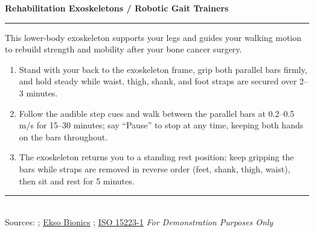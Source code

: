 \documentclass[11pt,a4paper]{article}
\begin{document}
\vspace{-0.3em}
\noindent\dashrule{\textwidth}
\begin{center}
{\large\bfseries Rehabilitation Exoskeletons / Robotic Gait Trainers}
\end{center}
\noindent\rule{\textwidth}{0.4pt}

\vspace{0.3em}
This lower-body exoskeleton supports your legs and guides your walking motion to rebuild strength and mobility after your bone cancer surgery.

\begin{enumerate}[leftmargin=1.5em,itemsep=2pt]
  \item Stand with your back to the exoskeleton frame, grip both parallel bars firmly, and hold steady while waist, thigh, shank, and foot straps are secured over 2--3 minutes.
  \item Follow the audible step cues and walk between the parallel bars at 0.2--0.5\,m/s for 15--30 minutes; say ``Pause'' to stop at any time, keeping both hands on the bars throughout.
  \item The exoskeleton returns you to a standing rest position; keep gripping the bars while straps are removed in reverse order (feet, shank, thigh, waist), then sit and rest for 5 minutes.
\end{enumerate}

\vfill
\noindent\rule{\textwidth}{0.4pt}\\
{\scriptsize Sources: \cite{molteni2023exoskeleton}; \href{https://eksobionics.com/eksohealth/}{Ekso Bionics} \cite{ekso2026products}; \href{https://www.iso.org/standard/77326.html}{ISO 15223-1} \cite{iso15223} \hfill \textit{For Demonstration Purposes Only}}
\end{document}
